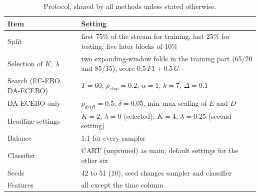 \documentclass[preprint,10pt]{elsarticle}
\begin{document}
\begin{table}[!htbp]
\centering\small
\caption{Protocol, shared by all methods unless stated otherwise.}\label{tab:protocol}
\begin{tabular}{ll}
\toprule
Item & Setting\\
\midrule
Split & first 75\% of the stream for training, last 25\% for testing; five later blocks of 10\%\\
Selection of $K$, $\lambda$ & two expanding-window folds in the training part (65/20 and 85/15), score $0.5\,F1+0.5\,G$\\
Search (EC-EBO, DA-ECEBO) & $T=60$, $p_{stop}=0.2$, $\alpha=1$, $k=7$, $\Delta=0.1$\\
DA-ECEBO only & $p_{drift}=0.5$, $\delta=0.05$, min--max scaling of $E$ and $D$\\
Headline settings & $K=2$, $\lambda=0$ (selected); $K=4$, $\lambda=0.25$ (second setting)\\
Balance & 1:1 for every sampler\\
Classifier & CART (unpruned) as main; default settings for the other six\\
Seeds & 42 to 51 (10), seed changes sampler and classifier\\
Features & all except the time column\\
\bottomrule
\end{tabular}
\end{table}
\end{document}

